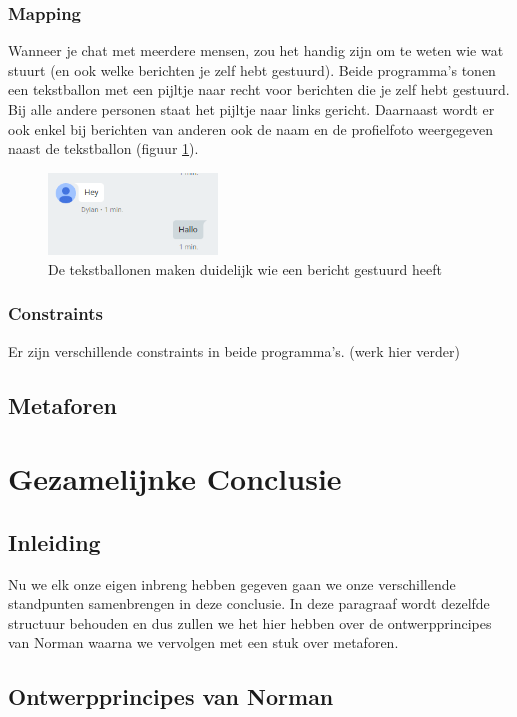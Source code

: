 \documentclass[11pt]{article}
\begin{document}
\subsubsection{Mapping}
Wanneer je chat met meerdere mensen, zou het handig zijn om te weten wie wat stuurt (en ook welke berichten je zelf hebt gestuurd). Beide programma's tonen een tekstballon met een pijltje naar recht voor berichten die je zelf hebt gestuurd. Bij alle andere personen staat het pijltje naar links gericht. Daarnaast wordt er ook enkel bij berichten van anderen ook de naam en de profielfoto weergegeven naast de tekstballon (figuur \ref{fig:HChat}).
\begin{figure}
	\centering
	\includegraphics[width=0.4\textwidth]{Dylan_HChat.png}
	\caption{De tekstballonen maken duidelijk wie een bericht gestuurd heeft}
	\label{fig:HChat}
\end{figure}
\subsubsection{Constraints}
Er zijn verschillende constraints in beide programma's. (werk hier verder)
\subsection{Metaforen}
\newpage


\section{Gezamelijnke Conclusie}
\subsection{Inleiding}
Nu we elk onze eigen inbreng hebben gegeven gaan we onze verschillende standpunten samenbrengen in deze conclusie. In deze paragraaf wordt dezelfde structuur behouden en dus zullen we het hier hebben over de ontwerpprincipes van Norman waarna we vervolgen met een stuk over metaforen.

\subsection{Ontwerpprincipes van Norman}
\end{document}
